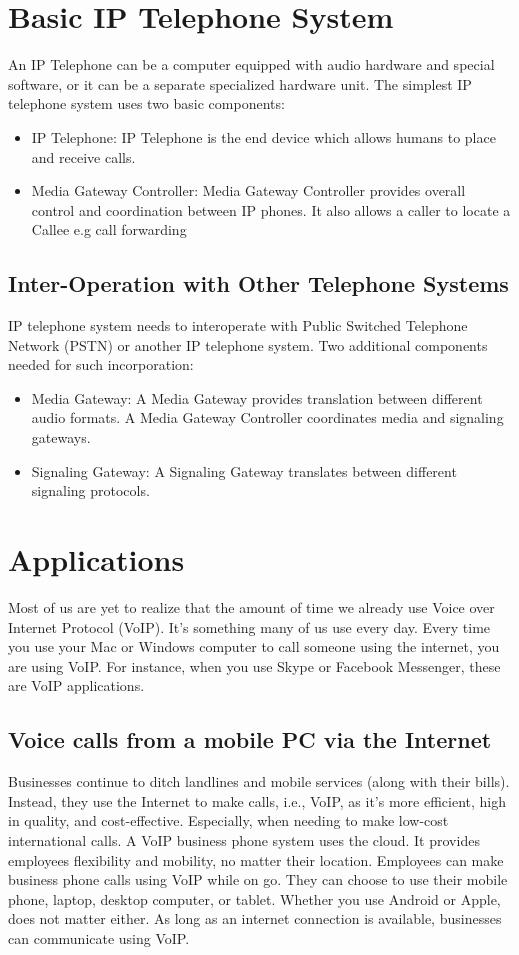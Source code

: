 \documentclass[12pt]{Book}
\begin{document}
    \section{Basic IP Telephone System}
    An IP Telephone can be a computer equipped with audio hardware and special software, or it can
be a separate specialized hardware unit. The simplest IP telephone system uses two basic
components:
\begin{itemize}
\item IP Telephone: IP Telephone is the end device which allows humans to place and receive
calls.

\item Media Gateway Controller: Media Gateway Controller provides overall control and
coordination between IP phones. It also allows a caller to locate a Callee e.g call forwarding

\end{itemize}

\subsection{Inter-Operation with Other Telephone Systems}
IP telephone system needs to interoperate with Public Switched Telephone Network (PSTN) or
another IP telephone system. Two additional components needed for such incorporation:
\begin{itemize}
\item Media Gateway: A Media Gateway provides translation between different audio formats. A Media Gateway Controller coordinates media and signaling gateways.
\item Signaling Gateway: A Signaling Gateway translates between different signaling protocols.
\end{itemize}
 

    \section{Applications}
    Most of us are yet to realize that the amount of time we already use Voice over Internet
Protocol (VoIP). It’s something many of us use every day. Every time you use your Mac or
Windows computer to call someone using the internet, you are using VoIP. For instance,
when you use Skype or Facebook Messenger, these are VoIP applications.
    \subsection{Voice calls from a mobile PC via the Internet}
    Businesses continue to ditch landlines and mobile services (along with their bills).
Instead, they use the Internet to make calls, i.e., VoIP, as it’s more efficient, high in
quality, and cost-effective. Especially, when needing to make low-cost international
calls. A VoIP business phone system uses the cloud. It provides employees 	 	
flexibility and mobility, no matter their location. Employees can make business 	 	
phone calls using VoIP while on go. They can choose to use their mobile phone, 		
laptop, desktop computer, or tablet. Whether you use Android or Apple, does not
matter either. As long as an internet connection is available, businesses can 	 	
communicate using VoIP.
\end{document}
